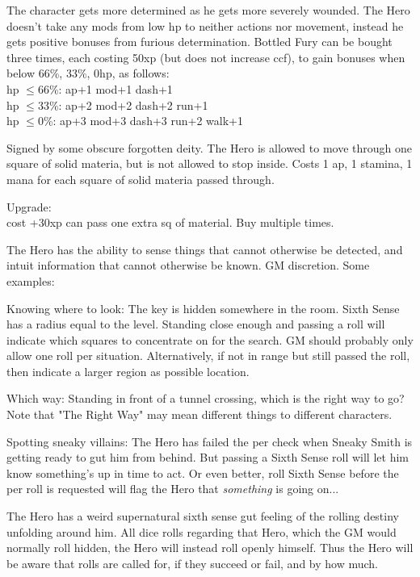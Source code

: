 The character gets more determined as he gets more severely wounded. The Hero doesn't take any mods from low hp to neither actions nor movement, instead he gets positive bonuses from furious determination. Bottled Fury can be bought three times, each costing 50xp (but does not increase ccf), to gain bonuses when below 66\%, 33\%, 0hp, as follows:\\
hp $\leq$66\%: ap+1 mod+1 dash+1\\
hp $\leq$33\%: ap+2 mod+2 dash+2 run+1\\
hp $\leq$0\%:  ap+3 mod+3 dash+3 run+2 walk+1


 Signed by some obscure forgotten deity. The Hero is allowed to move through one square of solid materia, but is not allowed to stop inside. Costs 1 ap, 1 stamina, 1 mana for each square of solid materia passed through.

Upgrade:\\
cost +30xp can pass one extra sq of material. Buy multiple times.


 The Hero has the ability to sense things that cannot otherwise be detected, and intuit information that cannot otherwise be known. GM discretion. Some examples:

Knowing where to look: The key is hidden somewhere in the room. Sixth Sense has a radius equal to the level. Standing close enough and passing a roll will indicate which squares to concentrate on for the search. GM should probably only allow one roll per situation. Alternatively, if not in range but still passed the roll, then indicate a larger region as possible location.

Which way: Standing in front of a tunnel crossing, which is the right way to go? Note that "The Right Way" may mean different things to different characters.

Spotting sneaky villains: The Hero has failed the per check when Sneaky Smith is getting ready to gut him from behind. But passing a Sixth Sense roll will let him know something's up in time to act. Or even better, roll Sixth Sense before the per roll is requested will flag the Hero that \emph{something} is going on...


 The Hero has a weird supernatural sixth sense gut feeling of the rolling destiny unfolding around him.
All dice rolls regarding that Hero, which the GM would normally roll hidden, the Hero will instead roll openly himself.
Thus the Hero will be aware that rolls are called for, if they succeed or fail, and by how much.


